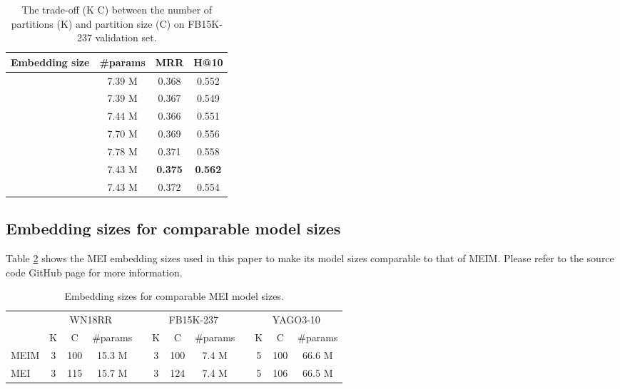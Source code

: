 \documentclass{article}
\theoremstyle{plain}
\theoremstyle{remark}
\begin{document}
\begin{table}[ht]
	\caption[]{The trade-off (K  C) between the number of partitions (K) and partition size (C) on FB15K-237 validation set.}
	\label{tab:param_tradeoff}
	\centering  
	\begin{adjustbox}{max width=\linewidth}
		\begin{tabular}{@{\extracolsep{2pt}}cccc}


			Embedding size & \#params & MRR & H@10 \\
			\midrule
			
			 \ \ \ \ & 7.39 M & 0.368 & 0.552 \\  \ \ \ \ & 7.39 M & 0.367 & 0.549 \\  & 7.44 M & 0.366 & 0.551 \\  & 7.70 M & 0.369 & 0.556 \\ \ \  & 7.78 M & 0.371 & 0.558 \\ \ \ \ \  & 7.43 M & \textbf{0.375} & \textbf{0.562} \\ \ \ \ \  & 7.43 M & 0.372 & 0.554 \\ 

\end{tabular}
	\end{adjustbox}
\end{table}

\vfill\break

\subsection{Embedding sizes for comparable model sizes}
Table \ref{tab:comparable_size} shows the MEI embedding sizes used in this paper to make its model sizes comparable to that of MEIM. Please refer to the source code GitHub page for more information.

\begin{table}[ht]
	\centering  
	\begin{adjustbox}{max width=\linewidth}
		\begin{tabular}{@{\extracolsep{-4pt}}lccclccclccc}


			& \multicolumn{3}{c}{WN18RR} && \multicolumn{3}{c}{FB15K-237} && \multicolumn{3}{c}{YAGO3-10} \\
			\cmidrule{2-4} \cmidrule{6-8} \cmidrule{10-12}
			& K & C & \#params && K & C & \#params && K & C & \#params \\
\cmidrule{2-4} \cmidrule{6-8} \cmidrule{10-12}
			
			MEIM & 3 & 100 & 15.3 M && 3 & 100 & 7.4 M && 5 & 100 & 66.6 M \\
MEI & 3 & 115 & 15.7 M && 3 & 124 & 7.4 M && 5 & 106 & 66.5 M \\

\end{tabular}
	\end{adjustbox}
	\caption[]{Embedding sizes for comparable MEI model sizes.}
	\label{tab:comparable_size}
\end{table}
\end{document}
